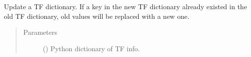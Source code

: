 \documentclass[letterpaper,10pt,english]{sphinxmanual}
\begin{document}
\begin{fulllineitems}
\begin{fulllineitems}
\label{\detokenize{modules/celloracle:celloracle.Oracle.updateTFinfo_dictionary}}
Update a TF dictionary.
If a key in the new TF dictionary already existed in the old TF dictionary, old values will be replaced with a new one.
\begin{quote}\begin{description}
\item[{Parameters}] \leavevmode
{} () \textendash{} Python dictionary of TF info.

\end{description}\end{quote}

\end{fulllineitems}


\end{fulllineitems}

\end{document}
